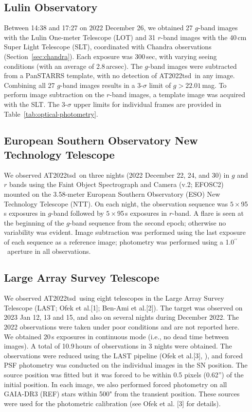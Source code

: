 \documentclass{nature_plusfigure}
\newcommand{\at}{AT2022tsd}
\newcommand{\arcsec}{$^{\prime\prime}$}
\begin{document}
\begin{methods}
\subsection{Lulin Observatory}
\label{sec:lulin}

Between 14:38 and 17:27 on 2022 December 26, we obtained 
27 $g$-band images with the Lulin One-meter Telescope (LOT) and 31 $r$-band images with the 40\,cm Super Light Telescope (SLT), coordinated with Chandra observations (Section~\ref{sec:chandra}). Each exposure was 300\,sec, with varying seeing conditions (with an average of 2.8\,arcsec). The $g$-band images were subtracted from a PanSTARRS template, with no detection of \at\ in any image.
Combining all 27 $g$-band images results in a 3-$\sigma$ limit of $g>22.01$\,mag.
To perform image subtraction on the $r$-band images, a template image was acquired with the SLT.
The 3-$\sigma$ upper limits for individual frames are provided in Table~\ref{tab:optical-photometry}.

\subsection{European Southern Observatory New Technology Telescope}
\label{sec:ntt}

We observed \at\ on three nights (2022 December 22, 24, and 30) in $g$ and $r$ bands using the Faint Object Spectrograph and Camera (v.2; EFOSC2\cite{Buzzoni1984}) mounted on the 3.58-meter European Southern Observatory (ESO) New Technology Telescope (NTT). On each night, the observation sequence was $5\times$95\,s exposures in $g$-band followed by $5\times$95\,s exposures in $r$-band.  A flare is seen at the beginning of the $g$-band sequence from the second epoch; otherwise no variability was evident.  Image subtraction was performed using the last exposure of each sequence as a reference image; photometry was performed using a 1.0\arcsec\ aperture in all observations.

\subsection{Large Array Survey Telescope}
\label{sec:last}

We observed \at\ using eight telescopes in the Large Array Survey Telescope (LAST; Ofek et al.[1]; Ben-Ami et al.[2]).
The target was observed on 2023 Jan 12, 13 and 15, and also on several nights during December 2022.
The 2022 observations were taken under poor conditions and are not reported here.
We obtained 20\,s exposures in continuous mode (i.e., no dead time between images).
A total of 10.9\,hours of observations in 3 nights were obtained.
The observations were reduced using the LAST pipeline
(Ofek et al.[3], \cite{Ofek2014,Ofek2019}), and forced PSF photometry was conducted on the individual images
in the SN position. 
The source position was fitted but it was forced to be within 0.5 pixels (0.62'') of the initial position.
In each image, we also performed forced photometry on all GAIA-DR3 (REF) stars
within 500" from the transient position.
These sources were used for the photometric calibration (see Ofek et al. [3] for details).


\end{methods}
\end{document}
